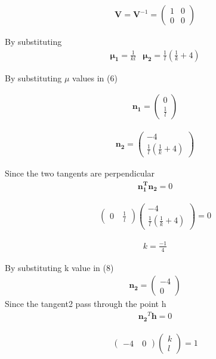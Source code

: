 \documentclass[journal,10pt,twocolumn]{article}
\let\vec\mathbf
\newcommand{\myvec}[1]{\ensuremath{\begin{pmatrix}#1\end{pmatrix}}}
\begin{document}
\begin{eqnarray*}
	\vec{V}=\vec{V}^{-1}= \myvec{1 & 0 \\ 0 & 0}
\end{eqnarray*}

By substituting 
\begin{eqnarray*}
	\vec{\mu_1}=\frac{1}{kl} & \vec{\mu_2}=\frac{1}{l}(\frac{1}{k}+4)
\end{eqnarray*}


By substituting $\mu$ values in (6)

\begin{eqnarray}
	\vec{n_1}=\myvec{0 \\ \frac{1}{l}}
\end{eqnarray}

\begin{eqnarray}
	\vec{n_2}=\myvec{-4 \\ \frac{1}{l}(\frac{1}{k}+4)}
\end{eqnarray}



Since the two tangents are perpendicular
\begin{eqnarray*}
	\vec{n_1^T}\vec{n_2}=0
\end{eqnarray*}

\begin{eqnarray*}
	\myvec{0 \ & \frac{1}{l}}\myvec{-4 \\ \frac{1}{l}(\frac{1}{k}+4)}=0
\end{eqnarray*}

\begin{eqnarray}
	k=\frac{-1}{4}
\end{eqnarray}

By substituting k value in (8)
\begin{eqnarray}
\vec{n_2}=\myvec{-4 \\ 0}
\end{eqnarray}
Since the tangent2 pass through the point h
\begin{eqnarray*}
\vec{n_2}^T\vec{h}=0
\end{eqnarray*}

\begin{eqnarray}
\myvec{-4 \ & 0} \myvec{k \\ l} = 1
\end{eqnarray}

 
\end{document}
